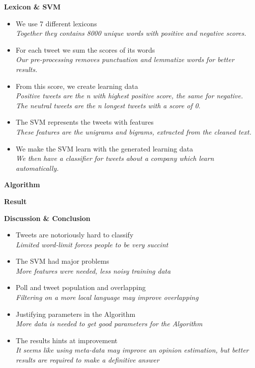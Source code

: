 \documentclass[landscape,20pt]{extarticle}
\newcommand*{\TitleFont}{\Huge \bf}
\newcommand*{\TextFont}{\normalsize \it}
\begin{document}
\clearpage
\thispagestyle{empty}

{\TitleFont Lexicon \& SVM}

\begin{itemize}
\item We use 7 different lexicons\\
{\TextFont Together they contains 8000 unique words with positive and negative scores.}
\item For each tweet we sum the scores of its words\\
{\TextFont Our pre-processing removes punctuation and lemmatize words for better results.}
\item From this score, we create learning data\\
{\TextFont Positive tweets are the \textit{n} with highest positive score, the same for negative.\\
The neutral tweets are the \textit{n} longest tweets with a score of 0.}
\item The SVM represents the tweets with features\\
{\TextFont These features are the unigrams and bigrams, extracted from the cleaned text.}
\item We make the SVM learn with the generated learning data\\
{\TextFont We then have a classifier for tweets about a company which learn automatically.}
\end{itemize}

\clearpage
\thispagestyle{empty}

{\TitleFont Algorithm}

\clearpage
\thispagestyle{empty}

{\TitleFont Result}

\clearpage
\thispagestyle{empty}

{\TitleFont Discussion \& Conclusion}

\begin{itemize}
\item Tweets are notoriously hard to classify\\
{\TextFont Limited word-limit forces people to be very succint}
\item The SVM had major problems\\
{\TextFont More features were needed, less noisy training data}
\item Poll and tweet population and overlapping\\
{\TextFont Filtering on a more local language may improve overlapping}
\item Justifying parameters in the Algorithm\\
{\TextFont More data is needed to get good parameters for the Algorithm}
\item The results hints at improvement\\
{\TextFont It seems like using meta-data may improve an opinion estimation, but better results are required to make a definitive answer}
\end{itemize}
\end{document}
